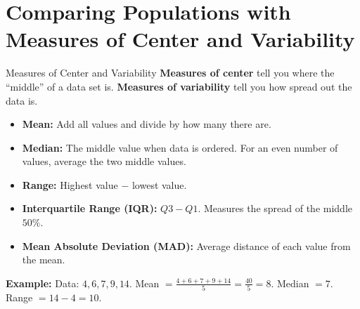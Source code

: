 \section{Comparing Populations with Measures of Center and Variability}

\begin{quickReview}{Measures of Center and Variability}
\textbf{Measures of center} tell you where the ``middle'' of a data set is. \textbf{Measures of variability} tell you how spread out the data is.

\begin{itemize}[leftmargin=*]
    \item \textbf{Mean:} Add all values and divide by how many there are.
    \item \textbf{Median:} The middle value when data is ordered. For an even number of values, average the two middle values.
    \item \textbf{Range:} Highest value $-$ lowest value.
    \item \textbf{Interquartile Range (IQR):} $Q3 - Q1$. Measures the spread of the middle $50\%$.
    \item \textbf{Mean Absolute Deviation (MAD):} Average distance of each value from the mean.
\end{itemize}

\medskip
\textbf{Example:} Data: $4, 6, 7, 9, 14$.
Mean $= \frac{4+6+7+9+14}{5} = \frac{40}{5} = 8$.
Median $= 7$. Range $= 14 - 4 = 10$.
\end{quickReview}

